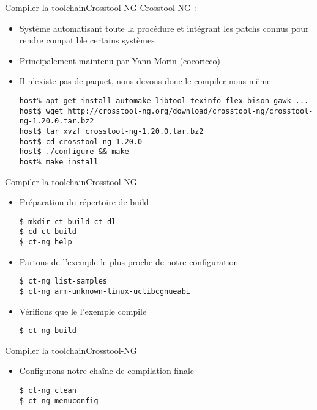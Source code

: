 \begin{frame}[fragile=singleslide]{Compiler la toolchain}{Crosstool-NG}
  Crosstool-NG :
  \begin{itemize}
  \item Système automatisant toute la procédure et intégrant les patchs
    connus pour rendre compatible certains systèmes
  \item Principalement maintenu par Yann Morin (cocoricco)
  \item Il n'existe  pas de paquet, nous devons  donc le compiler nous
    même:
    \begin{lstlisting}
host% apt-get install automake libtool texinfo flex bison gawk ...
host$ wget http://crosstool-ng.org/download/crosstool-ng/crosstool-ng-1.20.0.tar.bz2
host$ tar xvzf crosstool-ng-1.20.0.tar.bz2
host$ cd crosstool-ng-1.20.0
host$ ./configure && make
host% make install
    \end{lstlisting}
  \end{itemize}
\end{frame}

\begin{frame}[fragile=singleslide]{Compiler la toolchain}{Crosstool-NG}
  \begin{itemize}
  \item Préparation du répertoire de build
    \begin{lstlisting}
$ mkdir ct-build ct-dl
$ cd ct-build
$ ct-ng help
    \end{lstlisting}
  \item Partons de l'exemple le plus proche de notre configuration
    \begin{lstlisting}
$ ct-ng list-samples
$ ct-ng arm-unknown-linux-uclibcgnueabi
    \end{lstlisting}
  \item Vérifions que le l'exemple compile
    \begin{lstlisting}
$ ct-ng build
    \end{lstlisting}
  \end{itemize}
\end{frame}

\begin{frame}[fragile=singleslide]{Compiler la toolchain}{Crosstool-NG}
  \begin{itemize}
  \item Configurons notre chaîne de compilation finale
    \begin{lstlisting}
$ ct-ng clean
$ ct-ng menuconfig
       \end{lstlisting}
  \end{itemize}
\end{frame}

